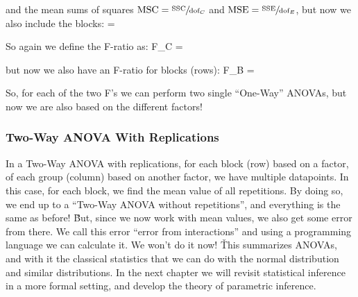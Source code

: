 and the mean sums of squares $\text{MSC} = \sfrac{\text{SSC}}{\text{dof}_{C}}$ and
$\text{MSE} = \sfrac{\text{SSE}}{\text{dof}_{E}}$, but now we also include the blocks:
\bse
{} = 
\ese

So again we define the F-ratio as:
\bse
F_{C} = 
\ese

but now we also have an F-ratio for blocks (rows):
\bse
F_{B} = 
\ese

So, for each of the two F's we can perform two single ``One-Way'' ANOVAs, but now we are also based on the
different factors!

\subsubsection{Two-Way ANOVA With Replications}

In a Two-Way ANOVA with replications, for each block (row) based on a factor, of each group (column) based on
another factor, we have multiple datapoints. In this case, for each block, we find the mean value of all
repetitions. By doing so, we end up to a ``Two-Way ANOVA without repetitions'', and everything is the same as
before! \v

But, since we now work with mean values, we also get some error from there. We call this error ``error from
interactions'' and using a programming language we can calculate it. We won't do it now! \v

This summarizes ANOVAs, and with it the classical statistics that we can do with the normal distribution and
similar distributions. In the next chapter we will revisit statistical inference in a more formal setting, and
develop the theory of parametric inference.